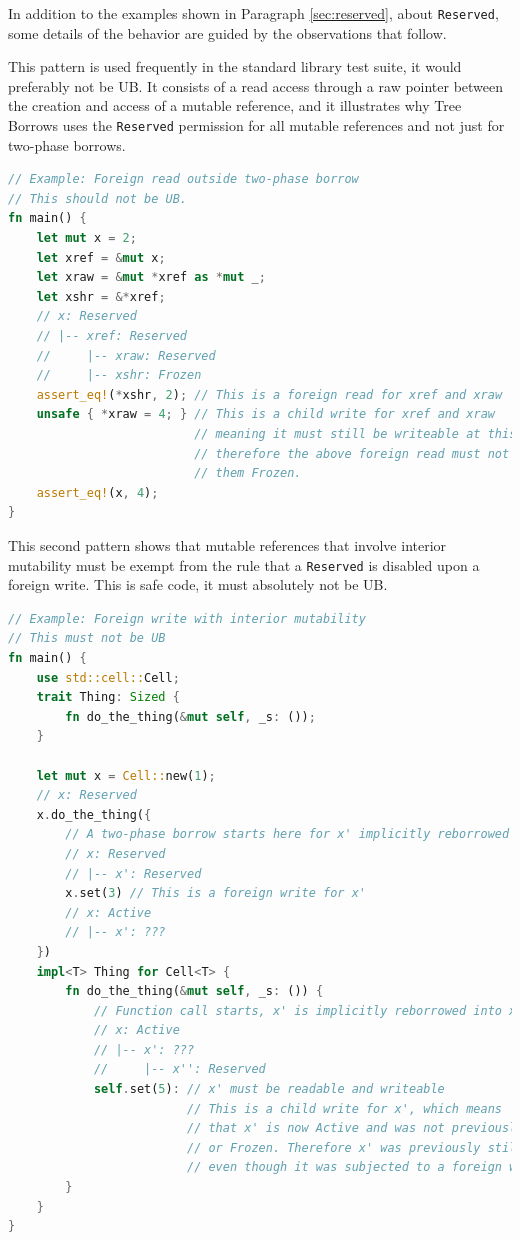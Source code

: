 \documentclass[a4paper,11pt]{article}
\theoremstyle{plain}
\theoremstyle{definition}
\theoremstyle{remark}
\newcommand{\tperm}[1]{\texttt{#1}}
\begin{document}
In addition to the examples shown in Paragraph \ref{sec:reserved}, about
\tperm{Reserved}, some details of the behavior are guided by the observations
that follow.

This pattern is used frequently in the standard library test suite,
it would preferably not be UB.
It consists of a read access through a raw pointer between the creation
and access of a mutable reference, and it illustrates why Tree Borrows
uses the \tperm{Reserved} permission for all mutable references and not
just for two-phase borrows.
\begin{lstlisting}[language=rust]
// Example: Foreign read outside two-phase borrow
// This should not be UB.
fn main() {
    let mut x = 2;
    let xref = &mut x;
    let xraw = &mut *xref as *mut _;
    let xshr = &*xref;
    // x: Reserved
    // |-- xref: Reserved
    //     |-- xraw: Reserved
    //     |-- xshr: Frozen
    assert_eq!(*xshr, 2); // This is a foreign read for xref and xraw
    unsafe { *xraw = 4; } // This is a child write for xref and xraw
                          // meaning it must still be writeable at this point,
                          // therefore the above foreign read must not have turned
                          // them Frozen.
    assert_eq!(x, 4);
}
\end{lstlisting}


This second pattern shows that mutable references that involve interior mutability
must be exempt from the rule that a \tperm{Reserved} is disabled upon a foreign
write. This is safe code, it must absolutely not be UB.
\begin{lstlisting}[language=rust]
// Example: Foreign write with interior mutability
// This must not be UB
fn main() {
    use std::cell::Cell;
    trait Thing: Sized {
        fn do_the_thing(&mut self, _s: ());
    }

    let mut x = Cell::new(1);
    // x: Reserved
    x.do_the_thing({
        // A two-phase borrow starts here for x' implicitly reborrowed from x
        // x: Reserved
        // |-- x': Reserved
        x.set(3) // This is a foreign write for x'
        // x: Active
        // |-- x': ???
    })
    impl<T> Thing for Cell<T> {
        fn do_the_thing(&mut self, _s: ()) {
            // Function call starts, x' is implicitly reborrowed into x''
            // x: Active
            // |-- x': ???
            //     |-- x'': Reserved
            self.set(5): // x' must be readable and writeable
                         // This is a child write for x', which means
                         // that x' is now Active and was not previously Disabled
                         // or Frozen. Therefore x' was previously still Reserved,
                         // even though it was subjected to a foreign write.
        }
    }
}
\end{lstlisting}
\end{document}

